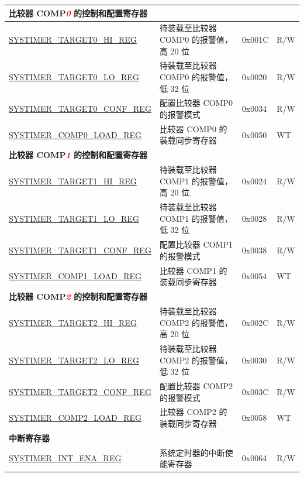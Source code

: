 \begin{longtable}{ | p{6cm} | p{7.2cm} | p{1.3cm} | p{1cm} | }
\multicolumn{4}{|l|}{\textbf{比较器 COMP\textcolor{red}{\it{0}} 的控制和配置寄存器}} \\ \hline
\hyperref[regdesc:SYSTIMERTARGET0HIREG]{SYSTIMER\_TARGET0\_HI\_REG} & 待装载至比较器 COMP0 的报警值，高 20 位 & 0x001C & R/W \\ \hline
\hyperref[regdesc:SYSTIMERTARGET0LOREG]{SYSTIMER\_TARGET0\_LO\_REG} & 待装载至比较器 COMP0 的报警值，低 32 位 & 0x0020 & R/W \\ \hline
\hyperref[regdesc:SYSTIMERTARGET0CONFREG]{SYSTIMER\_TARGET0\_CONF\_REG} & 配置比较器 COMP0 的报警模式 & 0x0034 & R/W \\ \hline
\hyperref[regdesc:SYSTIMERCOMP0LOADREG]{SYSTIMER\_COMP0\_LOAD\_REG} & 比较器 COMP0 的装载同步寄存器 & 0x0050 & WT \\ \hline
\multicolumn{4}{|l|}{\textbf{比较器 COMP\textcolor{red}{\it{1}} 的控制和配置寄存器}} \\ \hline
\hyperref[regdesc:SYSTIMERTARGET1HIREG]{SYSTIMER\_TARGET1\_HI\_REG} & 待装载至比较器 COMP1 的报警值，高 20 位 & 0x0024 & R/W \\ \hline
\hyperref[regdesc:SYSTIMERTARGET1LOREG]{SYSTIMER\_TARGET1\_LO\_REG} & 待装载至比较器 COMP1 的报警值，低 32 位 & 0x0028 & R/W \\ \hline
\hyperref[regdesc:SYSTIMERTARGET1CONFREG]{SYSTIMER\_TARGET1\_CONF\_REG} & 配置比较器 COMP1 的报警模式 & 0x0038 & R/W \\ \hline
\hyperref[regdesc:SYSTIMERCOMP1LOADREG]{SYSTIMER\_COMP1\_LOAD\_REG} & 比较器 COMP1 的装载同步寄存器 & 0x0054 & WT \\ \hline
\multicolumn{4}{|l|}{\textbf{比较器 COMP\textcolor{red}{\it{2}} 的控制和配置寄存器}} \\ \hline
\hyperref[regdesc:SYSTIMERTARGET2HIREG]{SYSTIMER\_TARGET2\_HI\_REG} & 待装载至比较器 COMP2 的报警值，高 20 位 & 0x002C & R/W \\ \hline
\hyperref[regdesc:SYSTIMERTARGET2LOREG]{SYSTIMER\_TARGET2\_LO\_REG} & 待装载至比较器 COMP2 的报警值，低 32 位 & 0x0030 & R/W \\ \hline
\hyperref[regdesc:SYSTIMERTARGET2CONFREG]{SYSTIMER\_TARGET2\_CONF\_REG} & 配置比较器 COMP2 的报警模式 & 0x003C & R/W \\ \hline
\hyperref[regdesc:SYSTIMERCOMP2LOADREG]{SYSTIMER\_COMP2\_LOAD\_REG} & 比较器 COMP2 的装载同步寄存器 & 0x0058 & WT \\ \hline
\multicolumn{4}{|l|}{\textbf{中断寄存器}} \\ \hline
\hyperref[regdesc:SYSTIMERINTENAREG]{SYSTIMER\_INT\_ENA\_REG} & 系统定时器的中断使能寄存器 & 0x0064 & R/W \\ \hline

\end{longtable}
